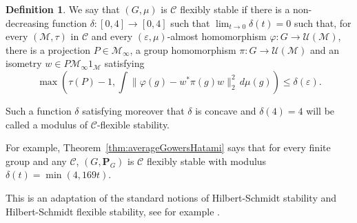 \documentclass[JEP,XML,SOM,Unicode,published]{cedram}
\theoremstyle{plain}
\theoremstyle{definition}
\newtheorem{definition}[theorem]{Definition}
\newcommand{\cM}{\mathcal{M}}
\newcommand{\vn}{\mathcal{C}}
\newcommand{\cU}{\mathcal{U}}
\newcommand{\prob}{\mathbf{P}}
\begin{document}
\begin{definition}\label{def:flexible_stability}
We say that $(G,\mu)$ is $\vn$ flexibly stable if there is a non-decreasing function $\delta:[0,4]\to [0,4]$ such that $\lim_{t \to 0} \delta(t) = 0$ such that, for every $(\cM,\tau)$ in $\vn$ and every $(\varepsilon,\mu)$-almost homomorphism $\varphi: G \to \cU(\cM)$, there is a projection $P \in \cM_\infty$, a group homomorphism $\pi:G \to \cU(\cM)$ and an isometry $w \in P \cM_\infty 1_\cM$ satisfying
\[
\max\left(\tau(P)-1, \int \|\varphi(g) - w^*\pi(g)w\|_2^2 \,d\mu(g)\right) \leq \delta(\varepsilon).
\]

Such a function $\delta$ satisfying moreover that $\delta$ is concave and $\delta(4)=4$ will be called a modulus of $\vn$-flexible stability.
\end{definition}
For example, Theorem~\ref{thm:averageGowersHatami} says that for every finite group and any $\vn$, $(G,\prob_G)$ is $\vn$ flexibly stable with modulus $\delta(t) = \min(4,169 t)$.

This is an adaptation of the standard notions of Hilbert-Schmidt stability and Hilbert-Schmidt flexible stability, see for example \cite{Ioana2}.
\end{document}
